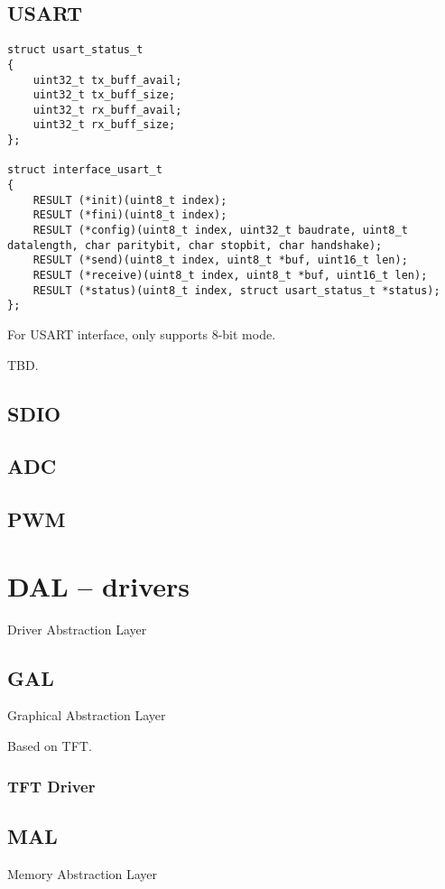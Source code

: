 \documentclass[a4paper,12pt]{book}
\begin{document}
\newpage
\section{USART}
\begin{lstlisting}
struct usart_status_t
{
	uint32_t tx_buff_avail;
	uint32_t tx_buff_size;
	uint32_t rx_buff_avail;
	uint32_t rx_buff_size;
};

struct interface_usart_t
{
	RESULT (*init)(uint8_t index);
	RESULT (*fini)(uint8_t index);
	RESULT (*config)(uint8_t index, uint32_t baudrate, uint8_t datalength, char paritybit, char stopbit, char handshake);
	RESULT (*send)(uint8_t index, uint8_t *buf, uint16_t len);
	RESULT (*receive)(uint8_t index, uint8_t *buf, uint16_t len);
	RESULT (*status)(uint8_t index, struct usart_status_t *status);
};
\end{lstlisting}
For USART interface, only supports 8-bit mode.

\vspace{6pt}
TBD.

\newpage
\section{SDIO}

\newpage
\section{ADC}

\newpage
\section{PWM}

\chapter{DAL -- drivers}
Driver Abstraction Layer
\minitoc

\newpage
\section{GAL}
Graphical Abstraction Layer

Based on TFT.
\newpage
\subsection{TFT Driver}

\newpage
\section{MAL}
Memory Abstraction Layer
\end{document}
